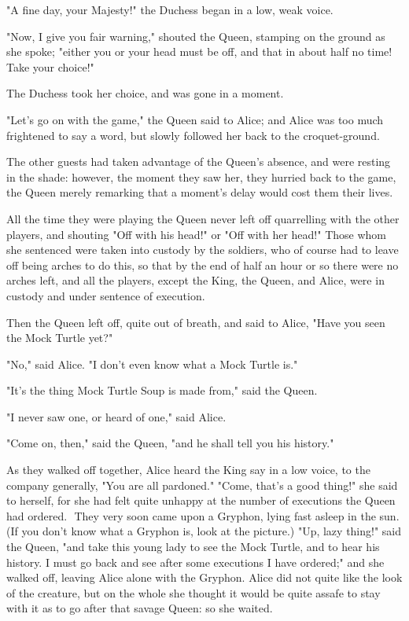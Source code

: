 ​"A fine day, your Majesty!" the Duchess began in a low, weak voice.

"Now, I give you fair warning," shouted the Queen, stamping on the ground as she spoke; "either you or your head must be off, and that in about half no time! Take your choice!"

The Duchess took her choice, and was gone in a moment.

"Let's go on with the game," the Queen said to Alice; and Alice was too much frightened to say a word, but slowly followed her back to the croquet-ground.

The other guests had taken advantage of the Queen's absence, and were resting in the shade: however, the moment they saw her, they hurried back to the game, the Queen merely remarking that a moment's delay would cost them their lives.

All the time they were playing the Queen never left off quarrelling with the other players, and shouting "Off with his head!" or "Off with her head!" Those whom she sentenced ​were taken into custody by the soldiers, who of course had to leave off being arches to do this, so that by the end of half an hour or so there were no arches left, and all the players, except the King, the Queen, and Alice, were in custody and under sentence of execution.

Then the Queen left off, quite out of breath, and said to Alice, "Have you seen the Mock Turtle yet?"

"No," said Alice. "I don't even know what a Mock Turtle is."

"It's the thing Mock Turtle Soup is made from," said the Queen.

"I never saw one, or heard of one," said Alice.

"Come on, then," said the Queen, "and he shall tell you his history."

As they walked off together, Alice heard the King say in a low voice, to the company generally, "You are all pardoned." "Come, that's a good thing!" she said to herself, for she had felt quite unhappy at the number of executions the Queen had ordered.
​
They very soon came upon a Gryphon, lying fast asleep in the sun. (If you don't know what a Gryphon is, look at the picture.) "Up, lazy thing!" said the Queen, "and take this young lady to see the Mock Turtle, and to hear his history. I must go back and see after some executions I have ordered;" and she walked off, leaving Alice alone with the Gryphon. Alice did not quite like the look of the creature, but on the whole she thought it would be quite as ​safe to stay with it as to go after that savage Queen: so she waited.

